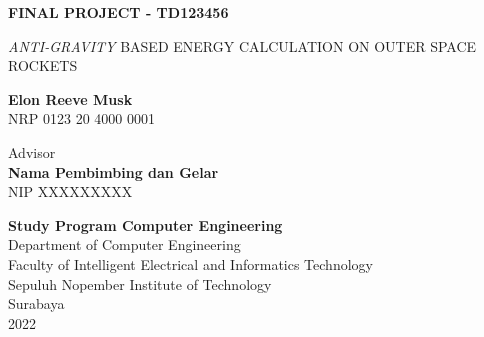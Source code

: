 \begin{flushleft}
  \fontsize{14pt}{17}
  \selectfont
  \textbf{FINAL PROJECT - TD123456}
\end{flushleft}


\vspace{5ex}

\begin{flushleft}
  \fontsize{18pt}{22}
  \selectfont
  \emph{ANTI-GRAVITY} BASED ENERGY CALCULATION ON OUTER SPACE ROCKETS
\end{flushleft}

\vspace{6ex}

\begin{flushleft}
  \fontsize{14pt}{17}
  \selectfont
  \textbf{Elon Reeve Musk}
  \\
  NRP 0123 20 4000 0001
\end{flushleft}

\vspace{6ex}

\begin{flushleft}
  \fontsize{14pt}{17}
  \selectfont
  Advisor \\
  \textbf{Nama Pembimbing dan Gelar} \\
  NIP XXXXXXXXX \\
\end{flushleft}

\vspace{6ex}

\begin{flushleft}
  \fontsize{12pt}{15}
  \selectfont
  \textbf{Study Program Computer Engineering}\\
  Department of Computer Engineering\\
  Faculty of Intelligent Electrical and Informatics Technology\\
  Sepuluh Nopember Institute of Technology\\
  Surabaya\\
  2022
\end{flushleft}
